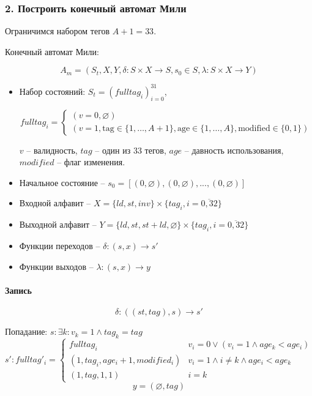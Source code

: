 
\subsubsection*{2. Построить конечный автомат Мили}

Ограничимся набором тегов $A + 1 = 33$.
\par\medskip

Конечный автомат Мили:

$$A_m = (S_t,X,Y,\delta:S\times X \rightarrow S, s_0 \in S, \lambda : S\times X \rightarrow Y)$$

\begin{itemize}[itemindent=0pt,leftmargin=0em,topsep=0pt,itemsep=-1ex,partopsep=1ex,parsep=1ex]
	\item Набор состояний: $S_t = (fulltag_i)^{31}_{i=0}$,

	\[
	fulltag_i =
	\begin{cases}
	  (v = 0, \varnothing) \\
	  (v = 1, \text{tag} \in \{1, \dots, A+1\}, \text{age} \in \{1, \dots, A\}, \text{modified} \in \{0,1\})
	\end{cases}
	\]

	$v$ -- валидность, $tag$ -- один из 33 тегов, $age$ -- давность использования, $modified$ -- флаг изменения.
	\par\medskip

	\item Начальное состояние -- $s_0 = [(0, \varnothing),(0, \varnothing),...,(0, \varnothing)]$
	\item Входной алфавит -- $X = \{ld,st,inv\}\times\{tag_i,i=\overline{0,32}\}$
	\item Выходной алфавит -- $Y = \{ld,st,st+ld,\varnothing\}\times\{tag_i,i=\overline{0,32}\}$
	\item Функции переходов -- $\delta: (s,x)\rightarrow s'$
	\item Функции выходов -- $\lambda: (s,x) \rightarrow y$
\end{itemize}

\paragraph*{Запись}

$$\delta : ((st,tag),s) \rightarrow s'$$

Попадание: $s: \exists k : v_k = 1 \land tag_k = tag$
\[
s':fulltag'_i =
\begin{cases}
	fulltag_i & v_i = 0 \lor (v_i = 1 \land age_k < age_i)\\
	(1,tag_i,age_{i}+1,modified_i) & v_i = 1 \land i \neq k \land age_i < age_k \\
	(1,tag,1,1) & i = k
\end{cases}
\]
$$y = (\varnothing,tag)$$

